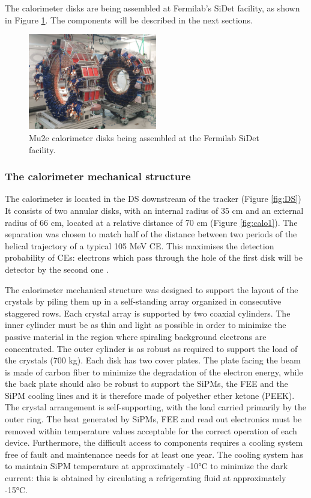 The calorimeter disks are being assembled at Fermilab's SiDet facility, as shown in Figure 
\ref{fig:calostatus}. The components will be described in the next sections.

\begin{figure}[!h]
    \centering
    \includegraphics[width =0.5\textwidth]{figures/png/Screenshot_20240706_151533.png}
    \caption[The Mu2e calorimeter disks.]{Mu2e calorimeter disks being assembled at the Fermilab SiDet facility.}
    \label{fig:calostatus}
\end{figure}

\subsubsection{The calorimeter mechanical structure}
The calorimeter is located in the DS downstream of the tracker (Figure \ref{fig:DS})
It consists of two annular disks, with an internal radius of 35 cm and 
an external radius of 66 cm, located at a relative distance of 70 cm (Figure \ref{fig:calo1}).
The separation was chosen to match half of the distance between two periods of the helical trajectory 
of a typical 105 MeV CE. This maximises the detection probability of CEs: electrons which pass through the hole of the first disk will be detector by the second one \cite{em7}. 


The calorimeter mechanical structure was designed to support the layout of the crystals 
by piling them up in a self-standing array organized in consecutive staggered rows. 
Each crystal array is supported by two coaxial cylinders. The inner cylinder must be 
as thin and light as possible in order to minimize the passive material in the 
region where spiraling background electrons are concentrated. The outer cylinder 
is as robust as required to support the load of the crystals (700 kg). Each disk 
has two cover plates. The plate facing the beam is made of carbon fiber to minimize 
the degradation of the electron energy, while the back plate should also be robust 
to support the SiPMs, the FEE and the SiPM cooling lines and it 
is therefore made of polyether ether ketone (PEEK).
The crystal arrangement is 
self-supporting, with the load carried primarily by the outer ring. 
The heat generated by SiPMs, FEE and read out electronics 
must be removed within temperature values acceptable for the correct operation 
of each device. Furthermore, the difficult access to components requires a 
cooling system free of fault and maintenance needs for at least one year. 
The cooling system has to maintain SiPM temperature at approximately -10°C to 
minimize the dark current: this is obtained by circulating a refrigerating fluid at approximately  -15°C.


